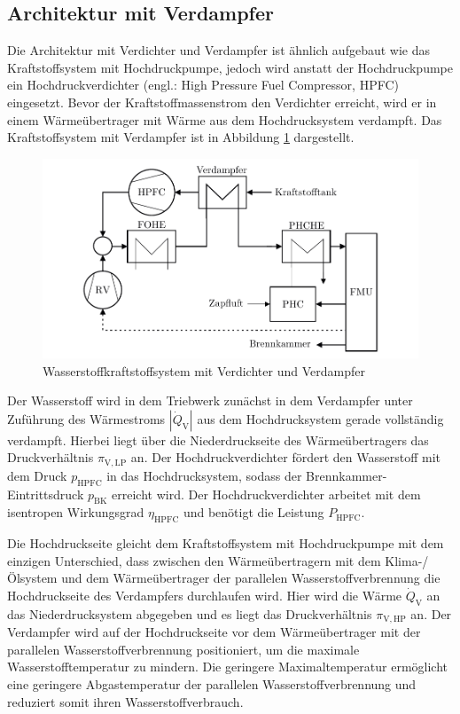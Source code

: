 \subsection{Architektur mit Verdampfer}

Die Architektur mit Verdichter und Verdampfer ist ähnlich aufgebaut wie das Kraftstoffsystem mit Hochdruckpumpe, jedoch wird anstatt der Hochdruckpumpe ein Hochdruckverdichter (engl.: High Pressure Fuel Compressor, HPFC) eingesetzt. Bevor der Kraftstoffmassenstrom den Verdichter erreicht, wird er in einem Wärmeübertrager mit Wärme aus dem Hochdrucksystem verdampft. Das Kraftstoffsystem mit Verdampfer ist in Abbildung \ref{fig:verdampfer} dargestellt.

\begin{figure}[ht]
\centering
\includegraphics[width=1\linewidth]{4_Abbildungen/2_Hauptteil/Kraftstoffsystem Abbildungen/after.pdf}
  \caption{Wasserstoffkraftstoffsystem mit Verdichter und Verdampfer}
  \label{fig:verdampfer}
\end{figure}
\FloatBarrier 

Der Wasserstoff wird in dem Triebwerk zunächst in dem Verdampfer unter Zuführung des Wärmestroms $|\dot{Q}_\mathrm{V}|$ aus dem Hochdrucksystem gerade vollständig verdampft. Hierbei liegt über die Niederdruckseite des Wärmeübertragers das Druckverhältnis $\pi_{\mathrm{V,LP}}$ an. Der Hochdruckverdichter fördert den Wasserstoff mit dem Druck $p_{\mathrm{HPFC}}$ in das Hochdrucksystem, sodass der Brennkammer-Eintrittsdruck $p_{\mathrm{BK}}$ erreicht wird. Der Hochdruckverdichter arbeitet mit dem isentropen Wirkungsgrad $\eta_{\mathrm{HPFC}}$ und benötigt die Leistung $P_{\mathrm{HPFC}}$. 

Die Hochdruckseite gleicht dem Kraftstoffsystem mit Hochdruckpumpe mit dem einzigen Unterschied, dass zwischen den Wärmeübertragern mit dem Klima-/Ölsystem und dem Wärmeübertrager der parallelen Wasserstoffverbrennung die Hochdruckseite des Verdampfers durchlaufen wird. Hier wird die Wärme $\dot{Q}_\mathrm{V}$ an das Niederdrucksystem abgegeben und es liegt das Druckverhältnis $\pi_{\mathrm{V,HP}}$ an. Der Verdampfer wird auf der Hochdruckseite vor dem Wärmeübertrager mit der parallelen Wasserstoffverbrennung positioniert, um die maximale Wasserstofftemperatur zu mindern. Die geringere Maximaltemperatur ermöglicht eine geringere Abgastemperatur der parallelen Wasserstoffverbrennung und reduziert somit ihren Wasserstoffverbrauch.

